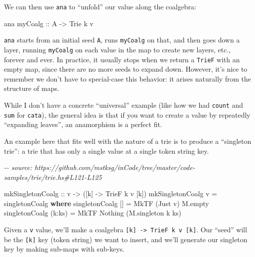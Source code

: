 \documentclass[]{article}
\newenvironment{Shaded}{}{}
\newcommand{\CommentTok}[1]{\textcolor[rgb]{0.38,0.63,0.69}{\textit{#1}}}
\newcommand{\DataTypeTok}[1]{\textcolor[rgb]{0.56,0.13,0.00}{#1}}
\newcommand{\KeywordTok}[1]{\textcolor[rgb]{0.00,0.44,0.13}{\textbf{#1}}}
\newcommand{\NormalTok}[1]{#1}
\newcommand{\OperatorTok}[1]{\textcolor[rgb]{0.40,0.40,0.40}{#1}}
\newcommand{\OtherTok}[1]{\textcolor[rgb]{0.00,0.44,0.13}{#1}}
\begin{document}
We can then use \texttt{ana} to ``unfold'' our value along the coalgebra:

\begin{Shaded}
\begin{Highlighting}[]
\NormalTok{ana}\OtherTok{ myCoalg ::} \DataTypeTok{A} \OtherTok{{-}\textgreater{}} \DataTypeTok{Trie}\NormalTok{ k v}
\end{Highlighting}
\end{Shaded}

\texttt{ana} starts from an initial seed \texttt{A}, runs \texttt{myCoalg} on
that, and then goes down a layer, running \texttt{myCoalg} on each value in the
map to create new layers, etc., forever and ever. In practice, it usually stops
when we return a \texttt{TrieF} with an empty map, since there are no more seeds
to expand down. However, it's nice to remember we don't have to special-case
this behavior: it arises naturally from the structure of maps.

While I don't have a concrete ``universal'' example (like how we had
\texttt{count} and \texttt{sum} for \texttt{cata}), the general idea is that if
you want to create a value by repeatedly ``expanding leaves'', an anamorphism is
a perfect fit.

An example here that fits well with the nature of a trie is to produce a
``singleton trie'': a trie that has only a single value at a single token string
key.

\begin{Shaded}
\begin{Highlighting}[]
\CommentTok{{-}{-} source: https://github.com/mstksg/inCode/tree/master/code{-}samples/trie/trie.hs\#L121{-}L125}

\OtherTok{mkSingletonCoalg ::}\NormalTok{ v }\OtherTok{{-}\textgreater{}}\NormalTok{ ([k] }\OtherTok{{-}\textgreater{}} \DataTypeTok{TrieF}\NormalTok{ k v [k])}
\NormalTok{mkSingletonCoalg v }\OtherTok{=}\NormalTok{ singletonCoalg}
  \KeywordTok{where}
\NormalTok{    singletonCoalg []     }\OtherTok{=} \DataTypeTok{MkTF}\NormalTok{ (}\DataTypeTok{Just}\NormalTok{ v) M.empty}
\NormalTok{    singletonCoalg (k}\OperatorTok{:}\NormalTok{ks) }\OtherTok{=} \DataTypeTok{MkTF} \DataTypeTok{Nothing}\NormalTok{  (M.singleton k ks)}
\end{Highlighting}
\end{Shaded}

Given a \texttt{v} value, we'll make a coalgebra
\texttt{{[}k{]}\ -\textgreater{}\ TrieF\ k\ v\ {[}k{]}}. Our ``seed'' will be
the \texttt{{[}k{]}} key (token string) we want to insert, and we'll generate
our singleton key by making sub-maps with sub-keys.
\end{document}
